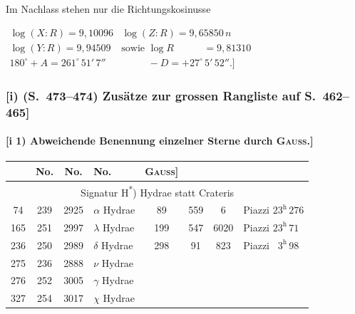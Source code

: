 \documentclass[12pt,a4paper]{article}
\theoremstyle{plain}
\theoremstyle{definition}
\theoremstyle{remark}
\begin{document}
\begin{footnotesize}
Im Nachlass stehen nur die Richtungskosinusse
\begin{center}
$\begin{array}{ll}
\log(X : R) = 9{,}10096 & \log(Z : R) = 9{,}65850\,n\\
\log(Y : R) = 9{,}94509 & \text{sowie }\log R \phantom{(:R)} = 9{,}81310\\
180^{\circ} + A = 261^{\circ}\,51'\,7'' & \phantom{\text{sowie }} -D = +27^{\circ}\,5'\,52''\!\!.]
\end{array}$
\end{center}
\end{footnotesize}

\newpage
\subsubsection*{[i) (S.~473--474) Zus\"atze zur grossen Rangliste auf S.~462--465]}

\paragraph*{[i 1) Abweichende Benennung einzelner Sterne durch \textsc{Gau\ss}.]}

\begin{small}
\begin{center}
\begin{tabular}{|c|c|c|l||c|c|c|l|}
\hline
[\textsc{Gau\ss} & \AA bo & Boss & Benennung bei & [\textsc{Gau\ss} & \AA bo & Boss & Benennung bei \\
No. & No. & No. & \textsc{Gau\ss}] & No. & No. & No. & \textsc{Gau\ss}] \\
\hline
\multicolumn{8}{c}{Signatur H\textsuperscript{*}) \quad Hydrae statt Crateris} \\
\hline
74 & 239 & 2925 & $\alpha$ Hydrae & 89 & 559 & 6 & Piazzi $23^{\mathrm{h}}\,276$ \\
165 & 251 & 2997 & $\lambda$ Hydrae & 199 & 547 & 6020 & Piazzi $23^{\mathrm{h}}\,71$ \\
236 & 250 & 2989 & $\delta$ Hydrae & 298 & 91 & 823 & Piazzi $\phantom{2}3^{\mathrm{h}}\,98$ \\
275 & 236 & 2888 & $\nu$ Hydrae & & & & \\
276 & 252 & 3005 & $\gamma$ Hydrae & & & & \\
327 & 254 & 3017 & $\chi$ Hydrae & & & & \\
\hline
\end{tabular}
\end{center}
\end{small}
\end{document}

